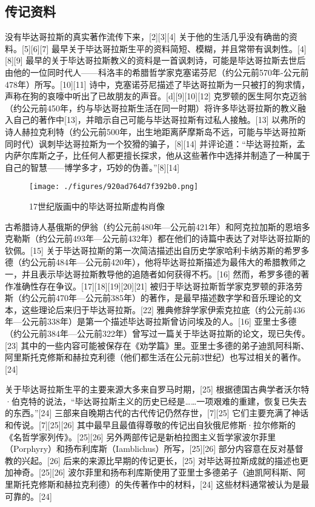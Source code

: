 \subsection{传记资料}  
没有毕达哥拉斯的真实著作流传下来，[2][3][4] 关于他的生活几乎没有确凿的资料。[5][6][7] 最早关于毕达哥拉斯生平的资料简短、模糊，并且常带有讽刺性。[4][8][9] 最早的关于毕达哥拉斯教义的资料是一首讽刺诗，可能是毕达哥拉斯去世后由他的一位同时代人——科洛丰的希腊哲学家克塞诺芬尼（约公元前570年-公元前478年）所写。[10][11] 诗中，克塞诺芬尼描述了毕达哥拉斯为一只被打的狗求情，声称在狗的哀嚎中听出了已故朋友的声音。[d][9][10][12] 克罗顿的医生阿尔克迈翁（约公元前450年，约与毕达哥拉斯生活在同一时期）将许多毕达哥拉斯的教义融入自己的著作中[13]，并暗示自己可能与毕达哥拉斯有过私人接触。[13] 以弗所的诗人赫拉克利特（约公元前500年，出生地距离萨摩斯岛不远，可能与毕达哥拉斯同时代）讽刺毕达哥拉斯为一个狡猾的骗子，[8][14] 并评论道：“毕达哥拉斯，孟内萨尔库斯之子，比任何人都更擅长探求，他从这些著作中选择并制造了一种属于自己的智慧——博学多才，巧妙的伪善。”[8][14]
\begin{figure}[ht]
\centering
\texttt{[image: ./figures/920ad764d7f392b0.png]}
\caption{17世纪版画中的毕达哥拉斯虚构肖像} \label{fig_Pythag_2}
\end{figure}
古希腊诗人基俄斯的伊翁（约公元前480年—公元前421年）和阿克拉加斯的恩培多克勒斯（约公元前493年—公元前432年）都在他们的诗篇中表达了对毕达哥拉斯的钦佩。[15] 关于毕达哥拉斯的第一次简洁描述出自历史学家哈利卡纳苏斯的希罗多德（约公元前484年—公元前420年），他将毕达哥拉斯描述为最伟大的希腊教师之一，并且表示毕达哥拉斯教导他的追随者如何获得不朽。[16] 然而，希罗多德的著作准确性存在争议。[17][18][19][20][21] 被归于毕达哥拉斯哲学家克罗顿的菲洛劳斯（约公元前470年—公元前385年）的著作，是最早描述数字学和音乐理论的文本，这些理论后来归于毕达哥拉斯。[22] 雅典修辞学家伊索克拉底（约公元前436年—公元前338年）是第一个描述毕达哥拉斯曾访问埃及的人。[16] 亚里士多德（约公元前384年—公元前322年）曾写过一篇关于毕达哥拉斯的论文，现已失传。[23] 其中的一些内容可能被保存在《劝学篇》里。亚里士多德的弟子迪凯阿科斯、阿里斯托克修斯和赫拉克利德（他们都生活在公元前3世纪）也写过相关的著作。[24]

关于毕达哥拉斯生平的主要来源大多来自罗马时期，[25] 根据德国古典学者沃尔特·伯克特的说法，“毕达哥拉斯主义的历史已经是……一项艰难的重建，恢复已失去的东西。”[24] 三部来自晚期古代的古代传记仍然存世，[7][25] 它们主要充满了神话和传说。[7][25][26] 其中最早且最值得尊敬的传记出自狄俄尼修斯·拉尔修斯的《名哲学家列传》。[25][26] 另外两部传记是新柏拉图主义哲学家波尔菲里（Porphyry）和扬布利库斯（Iamblichus）所写，[25][26] 部分内容意在反对基督教的兴起。[26] 后来的来源比早期的传记更长，[25] 对毕达哥拉斯成就的描述也更加神奇。[25][26] 波尔菲里和扬布利库斯使用了亚里士多德弟子（迪凯阿科斯、阿里斯托克修斯和赫拉克利德）的失传著作中的材料，[24] 这些材料通常被认为是最可靠的。[24]

